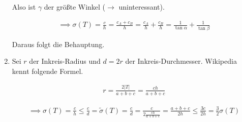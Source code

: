 \begin{solution}
\begin{enumerate}[label = \textbf{\alph*)}]
    Also ist $\gamma$ der größte Winkel ($\to$ uninteressant).

    \begin{align*}
      \implies
      \sigma(T)
      =
      \frac{c}{h}
      =
      \frac{c_A + c_B}{h}
      =
      \frac{c_A}{h} + \frac{c_B}{h}
      =
      \frac{1}{\tan \alpha} + \frac{1}{\tan \beta}
    \end{align*}

    Daraus folgt die Behauptung.

    \item Sei $r$ der Inkreis-Radius und $d = 2r$ der Inkreis-Durchmesser.
    Wikipedia kennt folgende Formel.

    \begin{align*}
      r = \frac{2 |T|}{a + b + c} = \frac{ch}{a + b + c}
    \end{align*}

    \begin{align*}
      \implies
      \sigma(T)
      =
      \frac{c}{h}
      \leq
      \frac{c}{d}
      =
      \tilde{\sigma}(T)
      =
      \frac{c}{d}
      =
      \frac{c}
      {
        2 \frac{ch}{a + b + c}
      }
      =
      \frac{a + b + c}{2h}
      \leq
      \frac{3c}{2h}
      =
      \frac{3}{2} \sigma(T)
    \end{align*}

  \end{enumerate}

  \end{solution}

